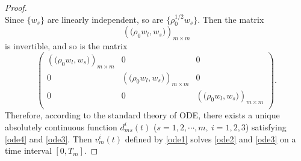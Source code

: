 \documentclass[12pt,a4paper]{amsart}
\numberwithin{equation}{section}
\theoremstyle{plain}
\theoremstyle{definition}
\begin{document}
\begin{proof}
\begin{equation}
	\end{equation}
	Since $\{w_s\}$ are linearly independent, so are $\{\rho_0^{1/2} w_s\}$.
	Then the matrix
	\begin{equation*}
	\left(\Big(\rho_0w_l,w_s\Big)\right)_{m\times m}
	\end{equation*}
	is invertible, and so is the matrix
	\begin{equation*}
	\begin{pmatrix}
	\left(\Big(\rho_0w_l,w_s\Big)\right)_{m\times m} &0 &0\\
	0 &\left(\Big(\rho_0w_l,w_s\Big)\right)_{m\times m} &0\\
	0 &0 &\left(\Big(\rho_0w_l,w_s\Big)\right)_{m\times m}\\
	\end{pmatrix}.
	\end{equation*}
	Therefore, according to the standard theory of ODE, there exists a unique absolutely continuous function $d^i_{ms}(t)$ ($s=1,2,\cdots,m,~i=1,2,3$) satisfying \eqref{ode4} and \eqref{ode3}.
	Then $v^i_m(t)$ defined by \eqref{ode1} solves \eqref{ode2} and \eqref{ode3} on a time interval $[0,T_m]$.
	

\end{proof}
\end{document}
